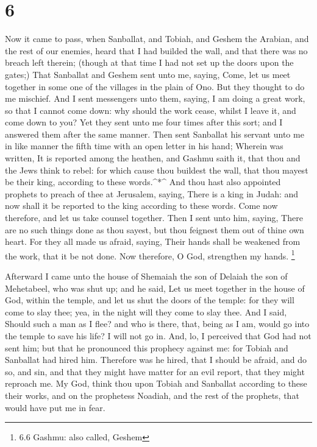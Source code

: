 \hypertarget{section-5}{%
\section{6}\label{section-5}}

 Now it came to pass, when Sanballat, and Tobiah, and Geshem
the Arabian, and the rest of our enemies, heard that I had builded the
wall, and that there was no breach left therein; (though at that time I
had not set up the doors upon the gates;)  That Sanballat
and Geshem sent unto me, saying, Come, let us meet together in some one
of the villages in the plain of Ono. But they thought to do me mischief.
 And I sent messengers unto them, saying, I am doing a great
work, so that I cannot come down: why should the work cease, whilst I
leave it, and come down to you?  Yet they sent unto me four
times after this sort; and I answered them after the same manner.
 Then sent Sanballat his servant unto me in like manner the
fifth time with an open letter in his hand;  Wherein was
written, It is reported among the heathen, and Gashmu saith it, that
thou and the Jews think to rebel: for which cause thou buildest the
wall, that thou mayest be their king, according to these words.\^{}*\^{}
 And thou hast also appointed prophets to preach of thee at
Jerusalem, saying, There is a king in Judah: and now shall it be
reported to the king according to these words. Come now therefore, and
let us take counsel together.  Then I sent unto him, saying,
There are no such things done as thou sayest, but thou feignest them out
of thine own heart.  For they all made us afraid, saying,
Their hands shall be weakened from the work, that it be not done. Now
therefore, O God, strengthen my hands. \footnote{6.6 Gashmu: also
  called, Geshem}

 Afterward I came unto the house of Shemaiah the son of
Delaiah the son of Mehetabeel, who was shut up; and he said, Let us meet
together in the house of God, within the temple, and let us shut the
doors of the temple: for they will come to slay thee; yea, in the night
will they come to slay thee.  And I said, Should such a man
as I flee? and who is there, that, being as I am, would go into the
temple to save his life? I will not go in.  And, lo, I
perceived that God had not sent him; but that he pronounced this
prophecy against me: for Tobiah and Sanballat had hired him.
 Therefore was he hired, that I should be afraid, and do
so, and sin, and that they might have matter for an evil report, that
they might reproach me.  My God, think thou upon Tobiah and
Sanballat according to these their works, and on the prophetess Noadiah,
and the rest of the prophets, that would have put me in fear.

